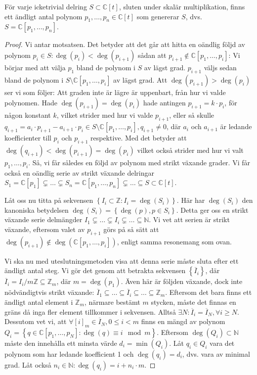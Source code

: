 \begin{Theorem}
\label{FinitelyGenerated}
För varje icketrivial delring $S \subset \mathbb{C}[t]$, sluten under skalär multiplikation, finns ett ändligt antal polynom $p_1,\ldots,p_n \in \mathbb{C}[t]$ som genererar $S$, dvs. $S=\mathbb{C}[p_1,\ldots,p_n]$.
\end{Theorem}

\begin{proof}
Vi antar motsatsen. Det betyder att det går att hitta en oändlig följd av polynom $p_i\in S:\deg(p_i)<\deg(p_{i+1})$ sådan att $p_{i+1} \notin \mathbb{C}[p_1,\ldots,p_i]$: Vi börjar med att välja $p_1$ bland de polynom i $S$ av lägst grad. $p_{i+1}$ väljs sedan bland de polynom i $S \setminus \mathbb{C}[p_1,\ldots,p_i]$ av lägst grad. Att $\deg(p_{i+1})>\deg(p_i)$ ser vi som följer: Att graden inte är lägre är uppenbart, från hur vi valde polynomen. Hade $\deg(p_{i+1})=\deg(p_i)$ hade antingen $p_{i+1}=k\cdot p_i$, för någon konstant $k$, vilket strider med hur vi valde $p_{i+1}$, eller så skulle $q_{i+1}=a_i\cdot p_{i+1}-a_{i+1}\cdot p_i \in S\setminus\mathbb{C}[p_1,\ldots,p_i], q_{i+1} \neq 0$, där $a_i$ och $a_{i+1}$ är ledande koefficienter till $p_i$ och $p_{i+1}$ respektive. Med det betyder att $\deg(q_{i+1})<\deg(p_{i+1})=\deg(p_i)$ vilket också strider med hur vi valt $p_1,\ldots,p_i$. Så, vi får således en följd av polynom med strikt växande grader. Vi får också en oändlig serie av strikt växande delringar $S_1=\mathbb{C}[p_1] \subsetneq \ldots \subsetneq S_n=\mathbb{C}[p_1,\ldots,p_n] \subsetneq \ldots \subseteq S \subset \mathbb{C}[t]$.

Låt oss nu titta på sekvensen $\left\{I_i \subset \mathbb{Z}: I_i=\deg(S_i)\right\}$. Här har $\deg(S_i)$ den kanoniska betydelsen $\deg(S_i)=\left\{\deg(p), p \in S_i\right\}$. Detta ger oss en strikt växande serie delmängder $I_1 \subsetneq \ldots \subsetneq I_i \subsetneq \ldots \subseteq \mathbb{N}$. Vi vet att serien är strikt växande, eftersom valet av $p_{i+1}$ görs på så sätt att $\deg(p_{i+1})\notin \deg(\mathbb{C}[p_1,\ldots,p_i])$, enligt samma resonemang som ovan.

Vi ska nu med uteslutningsmetoden visa att denna serie måste sluta efter ett ändligt antal steg. Vi gör det genom att betrakta sekvensen $\left\{\overline{I}_i\right\}$, där $\overline{I}_i=I_i/{m\mathbb{Z}} \subseteq \mathbb{Z}_m$, där $m=\deg(p_1)$. Även här är följden växande, dock inte nödvändigtvis strikt växande: $\overline{I}_1 \subseteq \ldots \subseteq \overline{I}_i \subseteq \ldots \subseteq \mathbb{Z}_m$. Eftersom det bara finns ett ändligt antal element i $\mathbb{Z}_m$, närmare bestämt $m$ stycken, måste det finnas en gräns då inga fler element tillkommer i sekvensen. Alltså $\exists N : \overline{I}_i = \overline{I}_N, \forall i \geq N$. Dessutom vet vi, att $\forall [i]_m \in \overline{I}_N, 0 \leq i < m$ finns en mängd av polynom $Q_i=\left\{q \in \mathbb{C}[p_1,\ldots,p_N] : \deg(q) \equiv i \mod{m}\right\}$. Eftersom $\deg(Q_i) \subset \mathbb{N}$ måste den innehålla ett minsta värde $d_i=\min(Q_i)$. Låt $q_i \in Q_i$ vara det polynom som har ledande koefficient 1 och $\deg(q_i)=d_i$, dvs. vara av minimal grad. Låt också $n_i \in \mathbb{N} : \deg(q_i) = i + n_i \cdot m$.


\end{proof}
